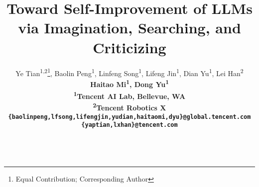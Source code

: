 \documentclass{article}
\title{Toward Self-Improvement of LLMs via Imagination, Searching, and Criticizing}
\author{Ye Tian\textsuperscript{1,2}\thanks{Equal Contribution; {\textdagger}Corresponding Author}, Baolin Peng\textsuperscript{1}\footnotemark[1], Linfeng Song\textsuperscript{1}\footnotemark[1], Lifeng Jin\textsuperscript{1}, Dian Yu\textsuperscript{1}, Lei Han\textsuperscript{2}\\
\bf{Haitao Mi}\textsuperscript{1}\textsuperscript{\textdagger}, \bf{Dong Yu}\textsuperscript{1}\\
\textsuperscript{1}Tencent AI Lab, Bellevue, WA\\
\textsuperscript{2}Tencent Robotics X \\
\texttt{\{baolinpeng,lfsong,lifengjin,yudian,haitaomi,dyu\}@global.tencent.com} \\
\texttt{\{yaptian,lxhan\}@tencent.com} \\\\
}
\begin{document}

\maketitle


\begin{abstract}



\end{abstract}
\end{document}
